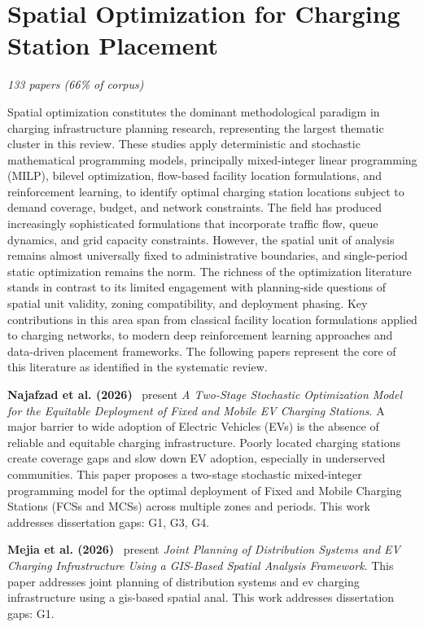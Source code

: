 \documentclass[letterpaper, 12pt, oneside, doublespacing]{Thesis}
\begin{document}
\section{Spatial Optimization for Charging Station Placement}

\textit{133 papers (66\% of corpus)}

Spatial optimization constitutes the dominant methodological paradigm in charging infrastructure planning research, representing the largest thematic cluster in this review. These studies apply deterministic and stochastic mathematical programming models, principally mixed-integer linear programming (MILP), bilevel optimization, flow-based facility location formulations, and reinforcement learning, to identify optimal charging station locations subject to demand coverage, budget, and network constraints. The field has produced increasingly sophisticated formulations that incorporate traffic flow, queue dynamics, and grid capacity constraints. However, the spatial unit of analysis remains almost universally fixed to administrative boundaries, and single-period static optimization remains the norm. The richness of the optimization literature stands in contrast to its limited engagement with planning-side questions of spatial unit validity, zoning compatibility, and deployment phasing. Key contributions in this area span from classical facility location formulations applied to charging networks, to modern deep reinforcement learning approaches and data-driven placement frameworks. The following papers represent the core of this literature as identified in the systematic review.


\noindent \textbf{Najafzad et al. (2026)}~\cite{a_two-stage_2026} present \textit{A Two-Stage Stochastic Optimization Model for the Equitable Deployment of Fixed and Mobile EV Charging Stations}. A major barrier to wide adoption of Electric Vehicles (EVs) is the absence of reliable and equitable charging infrastructure. Poorly located charging stations create coverage gaps and slow down EV adoption, especially in underserved communities. This paper proposes a two-stage stochastic mixed-integer programming model for the optimal deployment of Fixed and Mobile Charging Stations (FCSs and MCSs) across multiple zones and periods. This work addresses dissertation gaps: G1, G3, G4.



\noindent \textbf{Mejia et al. (2026)}~\cite{joint_planning_2026} present \textit{Joint Planning of Distribution Systems and EV Charging Infrastructure Using a GIS-Based Spatial Analysis Framework}. This paper addresses joint planning of distribution systems and ev charging infrastructure using a gis-based spatial anal. This work addresses dissertation gaps: G1.
\end{document}

